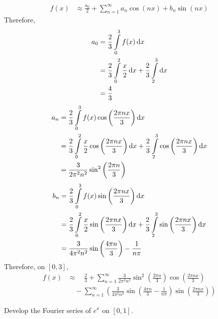 \documentclass[fleqn, a4paper, 11pt, oneside]{amsart}
\theoremstyle{definition}
\theoremstyle{theorem}
\begin{document}
\begin{solution}
	\begin{align*}
		f(x) &\approx \frac{a_0}{2} + \sum\limits_{n = 1}^{\infty} a_n \cos(n x) + b_n \sin(n x)
	\end{align*}
	Therefore,
	\begin{align*}
		a_0 &= \frac{2}{3} \int\limits_{0}^{3} f(x) \dif x\\
		&= \frac{2}{3} \int\limits_{0}^{2} \frac{x}{2} \dif x + \frac{2}{3} \int\limits_{2}^{3} \dif x\\
		&= \frac{4}{3}
	\end{align*}
	\begin{align*}
		a_n &= \frac{2}{3} \int\limits_{0}^{3} f(x) \cos\left( \frac{2 \pi n x}{3} \right) \dif x\\
		&= \frac{2}{3} \int\limits_{0}^{2} \frac{x}{2} \cos\left( \frac{2 \pi n x}{3} \right) \dif x + \frac{2}{3} \int\limits_{2}^{3} \cos\left( \frac{2 \pi n x}{3} \right) \dif x\\
		&= \frac{3}{2 \pi^2 n^2} \sin^2\left( \frac{2 \pi n}{3} \right)
	\end{align*}
	\begin{align*}
		b_n &= \frac{2}{3} \int\limits_{0}^{3} f(x) \sin\left( \frac{2 \pi n x}{3} \right) \dif x\\
		&= \frac{2}{3} \int\limits_{0}^{2} \frac{x}{2} \sin\left( \frac{2 \pi n x}{3} \right) \dif x + \frac{2}{3} \int\limits_{2}^{3} \sin\left( \frac{2 \pi n x}{3} \right) \dif x\\
		&= \frac{3}{4 \pi^2 n^2} \sin\left( \frac{4 \pi n}{3} \right) - \frac{1}{n \pi}
	\end{align*}
	Therefore, on $[0,3]$,
	\begin{align*}
		f(x) &\approx \quad \frac{2}{3} + \sum\limits_{n = 1}^{\infty} \frac{3}{2 \pi^2 n^2} \sin^2\left( \frac{2 \pi n}{3} \right) \cos\left( \frac{2 \pi n x}{3} \right)\\
		&\quad - \sum\limits_{n = 1}^{\infty} \left( \frac{3}{4 \pi^2 n^2} \sin\left( \frac{4 \pi n}{3} - \frac{1}{n \pi} \right) \sin\left( \frac{2 \pi n x}{3} \right) \right)
	\end{align*}
\end{solution}

\begin{question}
	Develop the Fourier series of $e^x$ on $[0,1]$.
\end{question}
\end{document}
